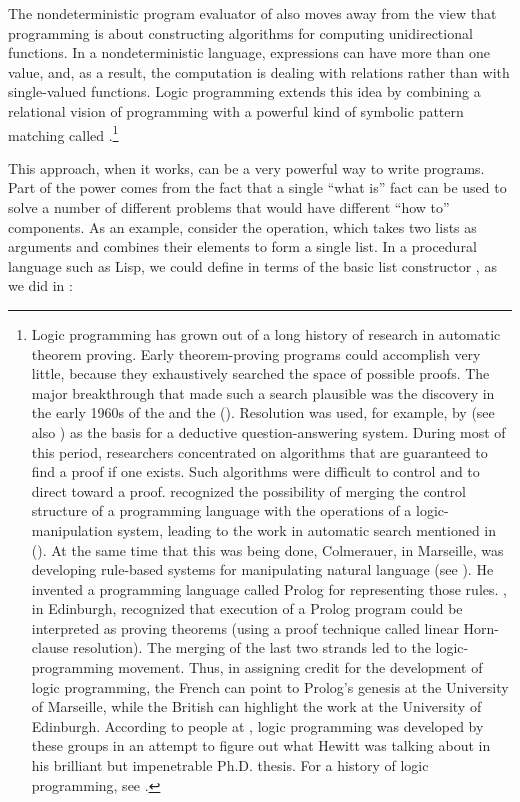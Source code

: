 The nondeterministic program evaluator of  also moves away
from the view that programming is about constructing algorithms for computing
unidirectional functions.  In a nondeterministic language, expressions can have
more than one value, and, as a result, the computation is dealing with
relations rather than with single-valued functions.  Logic programming extends
this idea by combining a relational vision of programming with a powerful kind
of symbolic pattern matching called .\footnote{Logic
programming has grown out of a long history of research in automatic theorem
proving.  Early theorem-proving programs could accomplish very little, because
they exhaustively searched the space of possible proofs.  The major
breakthrough that made such a search plausible was the discovery in the early
1960s of the  and the  ().  Resolution was used, for example, by
 (see also ) as the basis for a deductive
question-answering system.  During most of this period, researchers
concentrated on algorithms that are guaranteed to find a proof if one exists.
Such algorithms were difficult to control and to direct toward a proof.
 recognized the possibility of merging the control structure of a
programming language with the operations of a logic-manipulation system,
leading to the work in automatic search mentioned in 
().  At the same time that this was being done,
Colmerauer, in Marseille, was developing rule-based systems for manipulating
natural language (see ).  He invented a programming
language called Prolog for representing those rules.  , in
Edinburgh, recognized that execution of a Prolog program could be interpreted
as proving theorems (using a proof technique called linear Horn-clause
resolution).  The merging of the last two strands led to the logic-programming
movement.  Thus, in assigning credit for the development of logic programming,
the French can point to Prolog's genesis at the University of Marseille, while
the British can highlight the work at the University of Edinburgh.  According
to people at , logic programming was developed by these groups in
an attempt to figure out what Hewitt was talking about in his brilliant but
impenetrable Ph.D. thesis.  For a history of logic programming, see
.}

This approach, when it works, can be a very powerful way to write programs.
Part of the power comes from the fact that a single ``what is'' fact can be
used to solve a number of different problems that would have different ``how
to'' components.  As an example, consider the  operation, which
takes two lists as arguments and combines their elements to form a single list.
In a procedural language such as Lisp, we could define  in terms
of the basic list constructor , as we did in :

